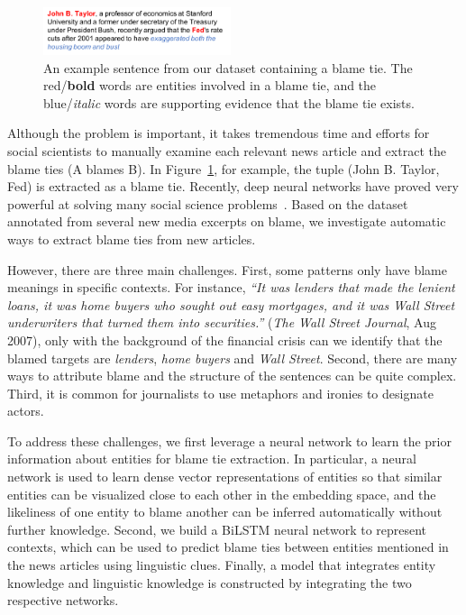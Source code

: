 \documentclass[letterpaper]{article} %
\begin{document}
\begin{figure}[t!]
\centering
\includegraphics[width=0.49\textwidth]{demosm}
\caption{An example sentence from our dataset containing a blame tie. The red/{\bf bold} words are entities involved in a blame tie, and the blue/{\it italic} words are supporting evidence that the blame tie exists.}
\label{figure:introdemo}
\end{figure}

Although the problem is important, it takes tremendous time and efforts for social scientists to manually examine each relevant news article and extract the blame ties (A blames B). In Figure~\ref{figure:introdemo}, for example, the tuple (John B. Taylor, Fed) is extracted as a blame tie. Recently, deep neural networks have proved very powerful at solving many social science problems~\cite{rule2015lexical,bail2016combining}. Based on the dataset annotated from several new media excerpts on blame, we investigate automatic ways to extract blame ties from new articles.

However, there are three main challenges. First, some patterns only have blame meanings in specific contexts. For instance, {\it ``It was lenders that made the lenient loans, it was home buyers who sought out easy mortgages, and it was Wall Street underwriters that turned them into securities.''} ({\it The Wall Street Journal}, Aug 2007), only with the background of the financial crisis can we identify that the blamed targets are {\it lenders}, {\it home buyers} and {\it Wall Street}. Second, there are many ways to attribute blame and the structure of the sentences can be quite complex. Third, it is common for journalists to use metaphors and ironies to designate actors.

To address these challenges, we first leverage a neural network to learn the prior information about entities for blame tie extraction. In particular, a neural network is used to learn dense vector representations of entities so that similar entities can be visualized close to each other in the embedding space, and the likeliness of one entity to blame another can be inferred automatically without further knowledge. Second, we build a BiLSTM neural network to represent contexts, which can be used to predict blame ties between entities mentioned in the news articles using linguistic clues. Finally, a model that integrates entity knowledge and linguistic knowledge is constructed by integrating the two respective networks. 
\end{document}
